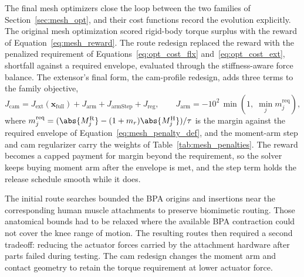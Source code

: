 The final mesh optimizers close the loop between the two families of Section~\ref{sec:mesh_opt}, and their cost functions record the evolution explicitly. The original mesh optimization scored rigid-body torque surplus with the reward of Equation~\eqref{eq:mesh_reward}. The route redesign replaced the reward with the penalized requirement of Equations~\eqref{eq:opt_cost_flx} and~\eqref{eq:opt_cost_ext}, shortfall against a required envelope, evaluated through the stiffness-aware force balance. The extensor's final form, the cam-profile redesign, adds three terms to the family objective,
\begin{equation}
J_{\mathrm{cam}} = J_{\mathrm{ext}}\!\left(\mathbf{x}_{\mathrm{full}}\right) + J_{\mathrm{arm}} + J_{\mathrm{armStep}} + J_{\mathrm{reg}},
\qquad
J_{\mathrm{arm}} = -10^{2}\,\min\!\left(1,\; \min_{j} m^{\mathrm{req}}_{j}\right),
\label{eq:opt_cost_cam}
\end{equation}
where $m^{\mathrm{req}}_{j} = (\abs{M^{\mathrm{R}}_{j}} - (1+m_{r})\abs{M^{\mathrm{H}}_{j}})/\tau$ is the margin against the required envelope of Equation~\eqref{eq:mesh_penalty_def}, and the moment-arm step and cam regularizer carry the weights of Table~\ref{tab:mesh_penalties}. The reward becomes a capped payment for margin beyond the requirement, so the solver keeps buying moment arm after the envelope is met, and the step term holds the release schedule smooth while it does.

The initial route searches bounded the BPA origins and insertions near the corresponding human muscle attachments to preserve biomimetic routing. Those anatomical bounds had to be relaxed where the available BPA contraction could not cover the knee range of motion. The resulting routes then required a second tradeoff: reducing the actuator forces carried by the attachment hardware after parts failed during testing. The cam redesign changes the moment arm and contact geometry to retain the torque requirement at lower actuator force.

